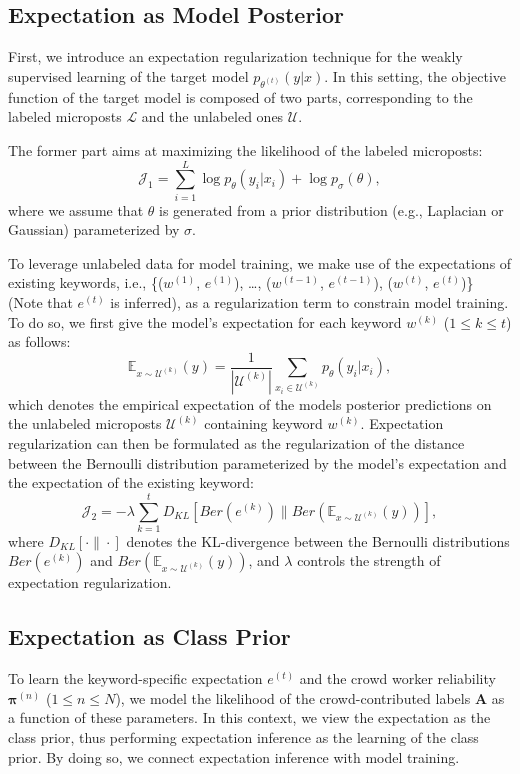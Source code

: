 \documentclass[letterpaper]{article}
\begin{document}
\subsection{Expectation as Model Posterior}
First, we introduce an expectation regularization technique for the weakly supervised learning of the target model $p_{\theta^{(t)}}(y|x)$. In this setting, the objective function of the target model is composed of two parts, corresponding to the labeled microposts $\mathcal{L}$ and the unlabeled ones $\mathcal{U}$.

The former part aims at maximizing the likelihood of the labeled microposts:
\begin{equation}
    \mathcal{J}_1 = \sum_{i=1}^L \log p_\theta(y_i | x_i) + \log p_\sigma(\theta),
\end{equation}
%
where we assume that $\theta$ is generated from a prior distribution (e.g., Laplacian or Gaussian) parameterized by $\sigma$.

To leverage unlabeled data for model training, we  make use of the expectations of existing keywords, i.e., \{($w^{(1)}$, $e^{(1)}$), \ldots, ($w^{(t-1)}$, $e^{(t-1)}$), ($w^{(t)}$, $e^{(t)}$)\} (Note that $e^{(t)}$ is inferred), as a regularization term to constrain model training. To do so, we first give the model's expectation for each keyword $w^{(k)}$ ($1\leq k\leq t$) as follows:
%
\begin{equation}
   \mathbb{E}_{x\sim \mathcal{U}^{(k)}}(y) =  \frac{1}{|\mathcal{U}^{(k)}|} \sum_{x_i\in \mathcal{U}^{(k)}} p_\theta(y_i|x_i),
\end{equation}
%
which denotes the empirical expectation of the models posterior predictions on the unlabeled microposts $\mathcal{U}^{(k)}$ containing keyword $w^{(k)}$. Expectation regularization can then be formulated as the regularization of the distance between the Bernoulli distribution parameterized by the model's expectation and the expectation of the existing keyword:
\begin{equation}
    \mathcal{J}_2 = - \lambda  \sum_{k=1}^t D_{KL}[Ber(e^{(k)})\|Ber(\mathbb{E}_{x\sim \mathcal{U}^{(k)}}(y))],
\end{equation}
where $D_{KL}[\cdot\|\cdot]$ denotes the KL-divergence between the Bernoulli distributions $Ber(e^{(k)})$ and $Ber(\mathbb{E}_{x\sim \mathcal{U}^{(k)}}(y))$, and $\lambda $ controls the strength of expectation regularization.

\subsection{Expectation as Class Prior}
To learn the keyword-specific expectation $e^{(t)}$ and the crowd worker reliability $\boldsymbol{\pi}^{(n)}$ ($1\leq n\leq N$), we model the likelihood of the crowd-contributed labels $\mathbf{A}$ as a function of these parameters. In this context, we view the expectation as the class prior, thus performing expectation inference as the learning of the class prior. By doing so, we connect expectation inference with model training.
\end{document}

